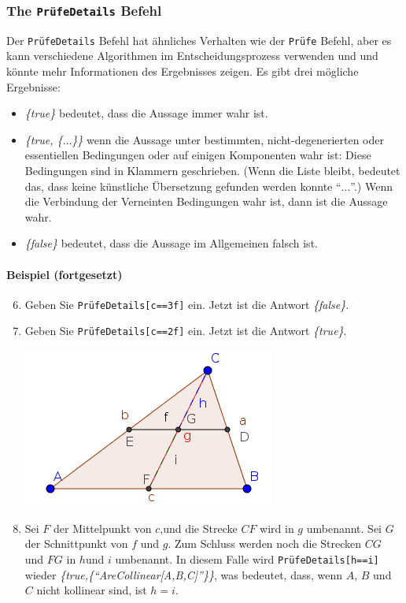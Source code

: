 \documentclass{article}
\begin{document}
\subsubsection{The \texttt{PrüfeDetails} Befehl}
Der \texttt{PrüfeDetails} Befehl hat ähnliches Verhalten wie der \texttt{Prüfe} Befehl, aber es kann verschiedene Algorithmen im Entscheidungsprozess verwenden und und könnte mehr Informationen des Ergebnisses zeigen. Es gibt drei mögliche Ergebnisse:
\begin{itemize}
    \item \textit{\{true\}} bedeutet, dass die Aussage immer wahr ist.
    \item \textit{\{true, \{$\ldots$\}\}} wenn die Aussage unter bestimmten, nicht-degenerierten \cite{Chou} oder essentiellen \cite{KovacsRecioSolyomGecse} Bedingungen oder auf einigen Komponenten \cite{ZhouWangSun} wahr ist: Diese Bedingungen sind in Klammern geschrieben. (Wenn die Liste bleibt, bedeutet das, dass keine künstliche Übersetzung gefunden werden konnte ``$\ldots$''.) Wenn die Verbindung der Verneinten Bedingungen wahr ist, dann ist die Aussage wahr.
    \item \textit{\{false\}} bedeutet, dass die Aussage im Allgemeinen falsch ist.
\end{itemize}
\paragraph{Beispiel (fortgesetzt)}
\begin{enumerate}
\setcounter{enumi}{5}
    \item Geben Sie \texttt{PrüfeDetails[c==3f]} ein. Jetzt ist die Antwort \textit{\{false\}}.
    \item Geben Sie \texttt{PrüfeDetails[c==2f]} ein. Jetzt ist die Antwort \textit{\{true\}}.
\begin{center}
\includegraphics[scale=0.5]{ProveDetails-example-1}
\end{center}
    \item Sei $F$ der Mittelpunkt von $c$,und die Strecke $CF$ wird in $g$ umbenannt. Sei $G$ der Schnittpunkt von $f$ und $g$. Zum Schluss werden noch die Strecken $CG$ und $FG$ in $h$und $i$ umbenannt. In diesem Falle wird \texttt{PrüfeDetails[h==i]} wieder \textit{\{true,\{``AreCollinear[A,B,C]''\}\}}, was bedeutet, dass, wenn $A$, $B$ und $C$ nicht kollinear sind, ist $h=i$.
\end{enumerate}
\end{document}
